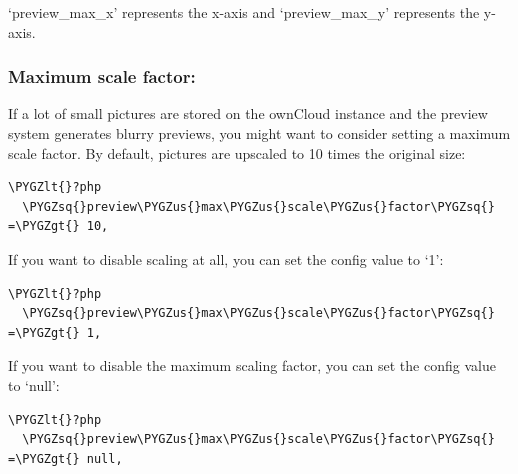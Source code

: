 \documentclass[letterpaper,10pt,english]{sphinxmanual}
\def\PYGZus{\char`\_}
\def\PYGZlt{\char`\<}
\def\PYGZgt{\char`\>}
\def\PYGZsq{\char`\'}
\renewcommand\PYGZsq{\textquotesingle}
\begin{document}
`preview\_max\_x' represents the x-axis and `preview\_max\_y' represents the y-axis.


\subsubsection{Maximum scale factor:}
\label{configuration_files/previews_configuration:maximum-scale-factor}
If a lot of small pictures are stored on the ownCloud instance and the preview
system generates blurry previews, you might want to consider setting a maximum
scale factor. By default, pictures are upscaled to 10 times the original size:

\begin{Verbatim}[commandchars=\\\{\}]
\PYGZlt{}?php
  \PYGZsq{}preview\PYGZus{}max\PYGZus{}scale\PYGZus{}factor\PYGZsq{} =\PYGZgt{} 10,
\end{Verbatim}

If you want to disable scaling at all, you can set the config value to `1':

\begin{Verbatim}[commandchars=\\\{\}]
\PYGZlt{}?php
  \PYGZsq{}preview\PYGZus{}max\PYGZus{}scale\PYGZus{}factor\PYGZsq{} =\PYGZgt{} 1,
\end{Verbatim}

If you want to disable the maximum scaling factor, you can set the config value
to `null':

\begin{Verbatim}[commandchars=\\\{\}]
\PYGZlt{}?php
  \PYGZsq{}preview\PYGZus{}max\PYGZus{}scale\PYGZus{}factor\PYGZsq{} =\PYGZgt{} null,
\end{Verbatim}
\end{document}
